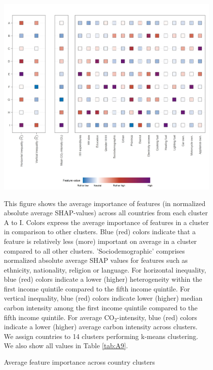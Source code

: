 \documentclass[12pt, a4paper]{article}
\newenvironment{subcaption2}
{\strut
\vspace{-5pt}
\begin{minipage}[b]{0.9\textwidth}
  \hspace*{-\parindent}
  \footnotesize}
 {\end{minipage}}
\begin{document}
\begin{figure}[ht!]
    \centering
    \includegraphics{1_Figures/Figure 3/Figure_3_Corrected.jpg}
    \caption{Average feature importance across country clusters}
    \label{fig:fig_3}
    \begin{subcaption2}
    This figure shows the average importance of features (in normalized absolute average SHAP-values) across all countries from each cluster A to I. Colors express the average importance of features in a cluster in comparison to other clusters. Blue (red) colors indicate that a feature is relatively less (more) important on average in a cluster compared to all other clusters. 'Sociodemographic' comprises normalized absolute average SHAP values for features such as ethnicity, nationality, religion or language.
    For horizontal inequality, blue (red) colors indicate a lower (higher) heterogeneity within the first income quintile compared to the fifth income quintile. For vertical inequality, blue (red) colors indicate lower (higher) median carbon intensity among the first income quintile compared to the fifth income quintile. For average CO$_{2}$-intensity, blue (red) colors indicate a lower (higher) average carbon intensity across clusters. We assign countries to 14 clusters performing k-means clustering. We also show all values in Table \ref{tab:A9}.
    \end{subcaption2}
\end{figure}
\end{document}
